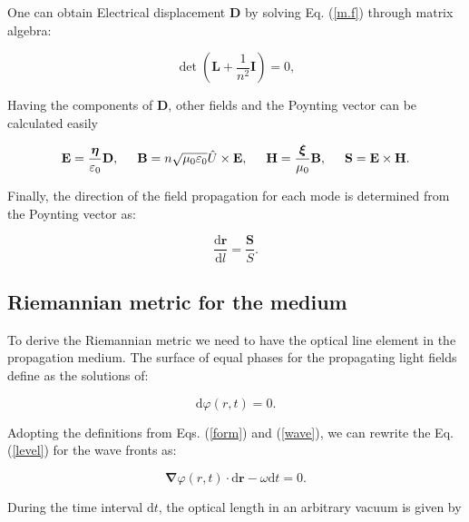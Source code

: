\documentclass[9pt,twocolumn,twoside]{osajnl}
\begin{document}
One can obtain Electrical displacement $\mathbf{D}$  by solving  Eq. (\ref{m.f}) through matrix algebra:


\begin{equation}\label{det}
    \det(\mathbf{L}+\frac{1}{n^{2}}\mathbf{I})=0,
\end{equation}

Having the components of  $\mathbf{D}$, other fields and the Poynting vector can be calculated easily  \cite{jackson1962classical}

\begin{equation}\label{e.h}
\mathbf{E}=\frac{\boldsymbol\eta}{\varepsilon_{0}}\mathbf{D}, \hspace{.5cm}  \mathbf{B}=n\sqrt{\mu_{0}\varepsilon_{0}}  \hat{U}\times{\mathbf{E}}, \hspace{.5cm}\mathbf{H}=\frac{\boldsymbol\xi}{\mu_{0}}\mathbf{B},
\hspace{.5cm}\mathbf{S}=  \mathbf{E}\times \mathbf{H}.
\end{equation}

Finally, the direction of the field propagation for each mode is determined from the Poynting vector as: 

\begin{equation}\label{p.v}
\dfrac{\mathbf{\mathrm{d}{r}}}{\mathrm{d}{l}}=\dfrac{\mathbf{S}}{S}.
\end{equation}

\subsection{Riemannian metric for the medium} \label{rim}

To derive the Riemannian metric we need to have the optical line element in the propagation medium.
The surface of equal phases for the propagating light fields define as the solutions of:

\begin{equation}\label{level}
\mathrm{d}{\varphi(r,t)}=0.
\end{equation}

Adopting the definitions from  Eqs. (\ref{form}) and (\ref{wave}), we can rewrite the Eq. (\ref{level}) for the wave fronts as:

\begin{equation}\label{phase1}
\mathbf{\nabla}{\varphi(r,t)}\cdot \mathbf{\mathrm{d}{r}}-\omega\mathrm{d}{t}=0.
\end{equation}

During the time interval  $\mathrm{d}{t}$,  the optical length in an arbitrary vacuum is given by
\end{document}
